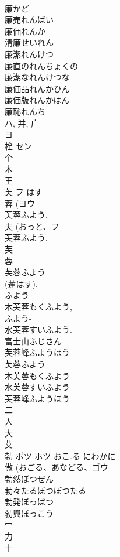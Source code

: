 \documentclass[8pt]{extreport}
\begin{document}
\begin{CJK}{UTF8}{min}
\\	廉かど
\\	廉売れんばい
\\	廉価れんか
\\	清廉せいれん
\\	廉潔れんけつ
\\	廉直のれんちょくの
\\	廉潔なれんけつな
\\	廉価品れんかひん
\\	廉価版れんかはん
\\	廉恥れんち
\\	ハ, 并, 广 
\\	ヨ	
\\	栓	セン		
\\	个 
\\	木 
\\	王 
\\	芙	フ	はす	
\\	蓉 (ヨウ 
\\	芙蓉ふよう. 
\\	夫 (おっと、フ 
\\	芙蓉ふよう, 
\\	芙 
\\	蓉 
\\	芙蓉ふよう 
\\	(蓮はす). 
\\	ふよう-
\\	木芙蓉もくふよう, 
\\	ふよう-
\\	水芙蓉すいふよう. 
\\	富士山ふじさん 
\\	芙蓉峰ふようほう 
\\	芙蓉ふよう 
\\	木芙蓉もくふよう 
\\	水芙蓉すいふよう 
\\	芙蓉峰ふようほう 
\\	二 
\\	人 
\\	大 
\\	艾 
\\	勃	ボツ ホツ	おこ.る にわかに	
\\	傲 (おごる、あなどる、ゴウ 
\\	勃然ぼつぜん
\\	勃々たるぼつぼつたる
\\	勃発ぼっぱつ
\\	勃興ぼっこう
\\	冖 
\\	力 
\\	十 

\end{CJK}
\end{document}
